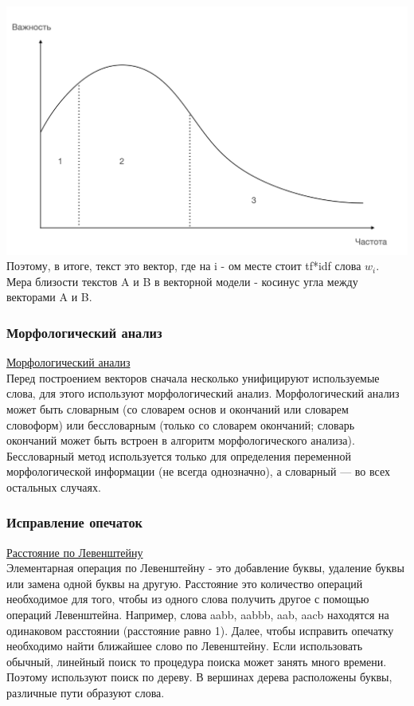 \includegraphics[width=0.5\linewidth]{13/Zipf}
Поэтому, в итоге, текст это вектор, где на i - ом месте стоит tf*idf слова $w_i$. Мера близости текстов A и B в векторной модели - косинус угла между векторами A и B.

\subsubsection {Морфологический анализ}
\href{http://prutzkow.com/ru-ru/science/natural-language-processing/morphology/}{Морфологический анализ} \\
Перед построением векторов сначала несколько унифицируют используемые слова, для этого используют морфологический анализ.
Морфологический анализ может быть словарным (со словарем основ и окончаний или словарем словоформ) или бессловарным (только со словарем окончаний; словарь окончаний может быть встроен в алгоритм морфологического анализа). Бессловарный метод используется только для определения переменной морфологической информации (не всегда однозначно), а словарный — во всех остальных случаях. 

\subsubsection {Исправление опечаток}
\href{https://clck.ru/A6RjQ}{Расстояние по Левенштейну} \\
Элементарная операция по Левенштейну - это добавление буквы, удаление буквы или замена одной буквы на другую. Расстояние это количество операций необходимое для того, чтобы из одного слова получить другое с помощью операций Левенштейна. Например, слова aabb, aabbb, aab, aacb находятся на одинаковом расстоянии (расстояние равно 1). Далее, чтобы исправить опечатку необходимо найти ближайшее слово по Левенштейну. Если использовать обычный, линейный поиск то процедура поиска может занять много времени. Поэтому используют поиск по дереву. В вершинах дерева расположены буквы, различные пути образуют слова. 

